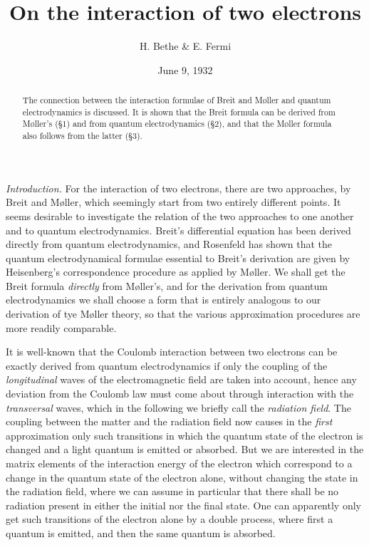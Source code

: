 \documentclass{article}
\title{On the interaction of two electrons}
\author{H. Bethe \& E. Fermi}
\date{June 9, 1932}
\begin{document}
\maketitle

\begin{abstract}
The connection between the interaction formulae of Breit\cite{1} and Møller\cite{2} and quantum electrodynamics is discussed. It is shown that the Breit formula can be derived from Møller's (§1) and from quantum electrodynamics (§2), and that the Møller formula also follows from the latter (§3).
\end{abstract}

\textit{Introduction.} For the interaction of two electrons, there are two approaches, by Breit\cite{1} and Møller\cite{2}, which seemingly start from two entirely different points. It seems desirable to investigate the relation of the two approaches to one another and to quantum electrodynamics. Breit's differential equation has been derived directly from quantum electrodynamics, and Rosenfeld\cite{3} has shown that the quantum electrodynamical formulae essential to Breit's derivation are given by Heisenberg's\cite{4} correspondence procedure as applied by Møller. We shall get the Breit formula \textit{directly} from Møller's, and for the derivation from quantum electrodynamics we shall choose a form that is entirely analogous to our derivation of tye Møller theory, so that the various approximation procedures are more readily comparable.

It is well-known that the Coulomb interaction between two electrons can be exactly derived from quantum electrodynamics if only the coupling of the \textit{longitudinal} waves of the electromagnetic field are taken into account\cite{5}, hence any deviation from the Coulomb law must come about through interaction with the \textit{transversal} waves, which in the following we briefly call the \textit{radiation field}. The coupling between the matter and the radiation field now causes in the \textit{first} approximation only such transitions in which the quantum state of the electron is changed and a light quantum is emitted or absorbed. But we are interested in the matrix elements of the interaction energy of the electron which correspond to a change in the quantum state of the electron alone, without changing the state in the radiation field, where we can assume in particular that there shall be no radiation present in either the initial nor the final state. One can apparently only get such transitions of the electron alone by a double process, where first a quantum is emitted, and then the same quantum is absorbed.
\end{document}
